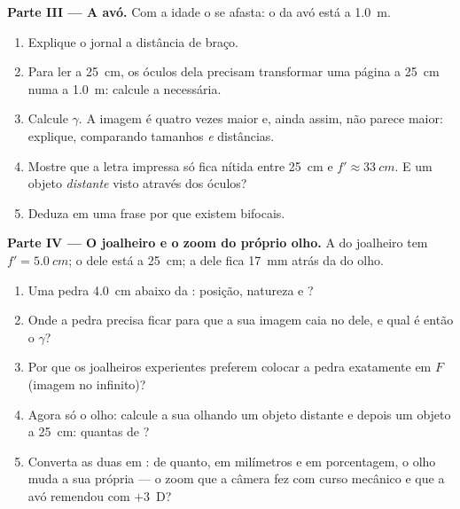\begin{problem}
\medskip
\noindent\textbf{Parte III --- A avó.}
Com a idade o  se afasta: o da avó está a \qty{1.0}{m}.
\begin{enumerate}[resume]
  \item Explique o jornal a distância de braço.
  \item Para ler a \qty{25}{cm}, os óculos dela precisam transformar uma
        página a \qty{25}{cm} numa  a \qty{1.0}{m}: calcule
        a  necessária.
  \item Calcule $\gamma$. A imagem é quatro vezes maior e, ainda assim,
        não parece maior: explique, comparando tamanhos \emph{e}
        distâncias.
  \item Mostre que a letra impressa só fica nítida entre \qty{25}{cm} e
        $f' \approx \qty{33}{cm}$. E um objeto \emph{distante} visto
        através dos óculos?
  \item Deduza em uma frase por que existem  bifocais.
\end{enumerate}

\medskip
\noindent\textbf{Parte IV --- O joalheiro e o zoom do próprio olho.}
A  do joalheiro tem $f' = \qty{5.0}{cm}$; o  dele está a
\qty{25}{cm}; a  dele fica \qty{17}{mm} atrás da  do olho.
\begin{enumerate}[resume]
  \item Uma pedra \qty{4.0}{cm} abaixo da : posição, natureza e
        ?
  \item Onde a pedra precisa ficar para que a sua imagem caia no  dele, e qual é então o $\gamma$?
  \item Por que os joalheiros experientes preferem colocar a pedra
        exatamente em $F$ (imagem no infinito)?
  \item Agora só o olho: calcule a sua  olhando um objeto
        distante e depois um objeto a \qty{25}{cm}: quantas  de
        ?
  \item Converta as duas  em : de quanto, em
        milímetros e em porcentagem, o olho muda a sua própria  --- o zoom que a câmera fez com curso mecânico e que a avó
        remendou com $+3$~D?
\end{enumerate}
\end{problem}
